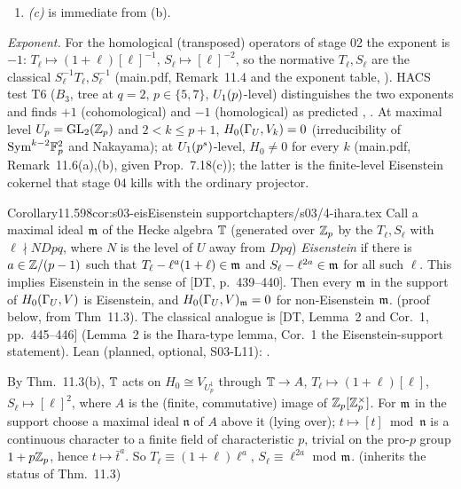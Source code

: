\begin{outline}
\begin{enumerate}[label=(\arabic*)]
\item \emph{(c)} is immediate from (b). \stproved
\end{enumerate}
\emph{Exponent.} For the homological (transposed) operators of stage 02 the exponent is $-1$: $T_\ell\mapsto(1+\ell)[\ell]^{-1}$, $S_\ell\mapsto[\ell]^{-2}$, so the
normative $T_\ell,S_\ell$ are the classical $S_\ell^{-1}T_\ell,S_\ell^{-1}$ (main.pdf, Remark~11.4 and the exponent table, \stproved). HACS test T6 ($B_3$, tree at
$q=2$, $p\in\{5,7\}$, $U_1(p)$-level) distinguishes the two exponents and finds $+1$ (cohomological) and $-1$ (homological) as predicted \stcomp{},
. At maximal level $U_p=\mathrm{GL}_2(\mathbb{Z}_p)$ and $2<k\le p+1$, $H_0(\Gamma_U,V_k)=0$ (irreducibility of $\mathrm{Sym}^{k-2}\mathbb{F}_p^2$ and Nakayama); at
$U_1(p^s)$-level, $H_0\ne0$ for every $k$ (main.pdf, Remark~11.6(a),(b), \stpmc{} given Prop.~7.18(c)); the latter is the finite-level Eisenstein cokernel that stage 04 kills
with the ordinary projector.
\end{outline}

\begin{quoted}{Corollary}{11.5}{98}{cor:s03-eis}{Eisenstein support}{chapters/s03/4-ihara.tex}\label{rpt:cor:s03-eis}
Call a maximal ideal $\mathfrak{m}$ of the Hecke algebra $\mathbb{T}$ (generated over $\mathbb{Z}_p$ by the $T_\ell,S_\ell$ with $\ell\nmid NDpq$, where $N$ is the level of $U$ away from $Dpq$) \emph{Eisenstein}
if there is $a\in\mathbb{Z}/(p-1)$ such that $T_\ell-\ell^a(1+\ell)\in\mathfrak{m}$ and $S_\ell-\ell^{2a}\in\mathfrak{m}$ for all such $\ell$. This implies
Eisenstein in the sense of [DT, p.~439--440]. Then every $\mathfrak{m}$ in the support of $H_0(\Gamma_U,V)$ is Eisenstein, and
$H_0(\Gamma_U,V)_{\mathfrak{m}}=0$ for non-Eisenstein $\mathfrak{m}$. \stpmc{} (proof below, from Thm~11.3). The classical analogue is [DT,
Lemma~2 and Cor.~1, pp.~445--446] \stcited{} \cite[Lemma 2, p.~445, and Cor.~1, p.~446]{DT} (Lemma~2 is the Ihara-type lemma, Cor.~1 the Eisenstein-support statement).
Lean (planned, optional, S03-L11): . \leanplanned
\end{quoted}
\begin{outline}
By Thm.~11.3(b), $\mathbb{T}$ acts on $H_0\cong V_{U^1_p}$ through $\mathbb{T}\to A$, $T_\ell\mapsto(1+\ell)[\ell]$, $S_\ell\mapsto[\ell]^2$, where $A$ is the (finite, commutative) image of
$\mathbb{Z}_p[\mathbb{Z}_p^\times]$. For $\mathfrak{m}$ in the support choose a maximal ideal $\mathfrak n$ of $A$ above it (lying over); $t\mapsto[t]\bmod\mathfrak n$ is a continuous character to a finite
field of characteristic $p$, trivial on the pro-$p$ group $1+p\mathbb{Z}_p$, hence $t\mapsto\bar t^a$. So $T_\ell\equiv(1+\ell)\ell^a$, $S_\ell\equiv\ell^{2a}$ mod $\mathfrak{m}$. \stpmc{}
(inherits the status of Thm.~11.3)
\end{outline}

